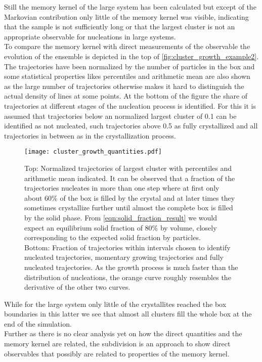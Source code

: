 Still the memory kernel of the large system has been calculated but except of the Markovian contribution only little of the memory kernel was visible, indicating that the sample is not sufficiently long or that the largest cluster is not an appropriate observable for nucleations in large systems.\\

To compare the memory kernel with direct measurements of the observable the evolution of the ensemble is depicted in the top of \autoref{fig:cluster_growth_example2}. The trajectories have been normalized by the number of particles in the box and some statistical properties likes percentiles and arithmetic mean are also shown as the large number of trajectories otherwise makes it hard to distinguish the actual density of lines at some points. At the bottom of the figure the share of trajectories at different stages of the nucleation process is identified. For this it is assumed that trajectories below an normalized largest cluster of 0.1 can be identified as not nucleated, such trajectories above 0.5 as fully crystallized and all trajectories in between as in the crystallization process.\\

\begin{figure}[h]
\centering
\texttt{[image: cluster\_growth\_quantities.pdf]}
\caption[Largest cluster trajectories of small system with percentiles and average]{Top: Normalized trajectories of largest cluster with percentiles and arithmetic mean indicated. It can be observed that a fraction of the trajectories nucleates in more than one step where at first only about 60\% of the box is filled by the crystal and at later times they sometimes crystallize further until almost the complete box is filled by the solid phase. From \autoref{eqn:solid_fraction_result} we would expect an equilibrium solid fraction of 80\% by volume, closely corresponding to the expected solid fraction by particles.\\
Bottom: Fraction of trajectories within intervals chosen to identify nucleated trajectories, momentary growing trajectories and fully nucleated trajectories. As the growth process is much faster than the distribution of nucleations, the orange curve roughly resembles the derivative of the other two curves.}
\label{fig:cluster_growth_example2}
\end{figure}

While for the large system only little of the crystallites reached the box boundaries in this latter we see that almost all clusters fill the whole box at the end of the simulation.\\
Further as there is no clear analysis yet on how the direct quantities and the memory kernel are related, the subdivision is an approach to show direct observables that possibly are related to properties of the memory kernel.\\


